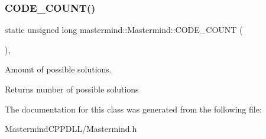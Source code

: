 \subsubsection{\texorpdfstring{C\+O\+D\+E\+\_\+\+C\+O\+U\+N\+T()}{CODE\_COUNT()}}
{\footnotesize\ttfamily static unsigned long mastermind\+::\+Mastermind\+::\+C\+O\+D\+E\+\_\+\+C\+O\+U\+NT (\begin{DoxyParamCaption}{ }\end{DoxyParamCaption})\hspace{0.3cm}{\ttfamily [inline]}, {\ttfamily [static]}}



Amount of possible solutions. 

\begin{DoxyReturn}{Returns}
number of possible solutions 
\end{DoxyReturn}


The documentation for this class was generated from the following file\+:\begin{DoxyCompactItemize}
\item 
Mastermind\+C\+P\+P\+D\+L\+L/Mastermind.\+h\end{DoxyCompactItemize}
